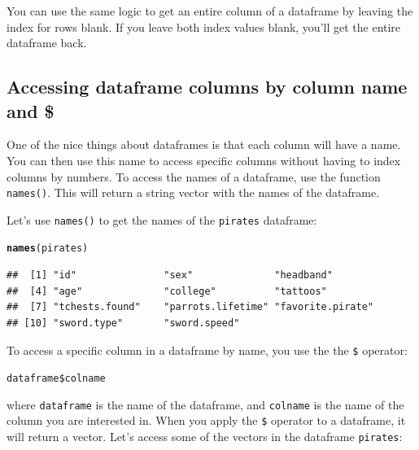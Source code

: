 \documentclass{tufte-book}\usepackage[]{graphicx}\usepackage[]{color}
\makeatletter
\newcommand{\hlopt}[1]{\textcolor[rgb]{0,0,0}{#1}}%
\newcommand{\hlstd}[1]{\textcolor[rgb]{0.345,0.345,0.345}{#1}}%
\newcommand{\hlkwd}[1]{\textcolor[rgb]{0.737,0.353,0.396}{\textbf{#1}}}%
\newenvironment{kframe}{%
 \def\at@end@of@kframe{}%
 \ifinner\ifhmode%
  \def\at@end@of@kframe{\end{minipage}}%
  \begin{minipage}{\columnwidth}%
 \fi\fi%
 \def\FrameCommand##1{\hskip\@totalleftmargin \hskip-\fboxsep
 \colorbox{shadecolor}{##1}\hskip-\fboxsep
     \hskip-\linewidth \hskip-\@totalleftmargin \hskip\columnwidth}%
 \MakeFramed {\advance\hsize-\width
   \@totalleftmargin\z@ \linewidth\hsize
   \@setminipage}}%
 {\par\unskip\endMakeFramed%
 \at@end@of@kframe}
\newenvironment{knitrout}{}{} %
\newcommand{\newfun}[1]{\begin{LARGE} \begin{center} \texttt{#1} \end{center} \end{LARGE}}
\makeatother
\begin{document}
\begin{footnotesize}
You can use the same logic to get an entire column of a dataframe by leaving the index for rows blank. If you leave both index values blank, you'll get the entire dataframe back.

\subsection{Accessing dataframe columns by column name and \$}

One of the nice things about dataframes is that each column will have a name. You can then use this name to access specific columns without having to index columns by numbers. To access the names of a dataframe, use the function \texttt{names()}. This will return a string vector with the names of the dataframe.

Let's use \texttt{names()} to get the names of the \texttt{pirates} dataframe:

\begin{footnotesize}
\begin{knitrout}
\color{fgcolor}\begin{kframe}
\begin{alltt}
\hlkwd{names}\hlstd{(pirates)}
\end{alltt}
\begin{verbatim}
##  [1] "id"               "sex"              "headband"        
##  [4] "age"              "college"          "tattoos"         
##  [7] "tchests.found"    "parrots.lifetime" "favorite.pirate" 
## [10] "sword.type"       "sword.speed"
\end{verbatim}
\end{kframe}
\end{knitrout}
\end{footnotesize}

To access a specific column in a dataframe by name, you use the the \texttt{\$} operator:

\newfun{dataframe\$colname}

where \texttt{dataframe} is the name of the dataframe, and \texttt{colname} is the name of the column you are interested in. When you apply the \texttt{\$} operator to a dataframe, it will return a vector. Let's access some of the vectors in the dataframe \texttt{pirates}:



\end{footnotesize}
\end{document}
